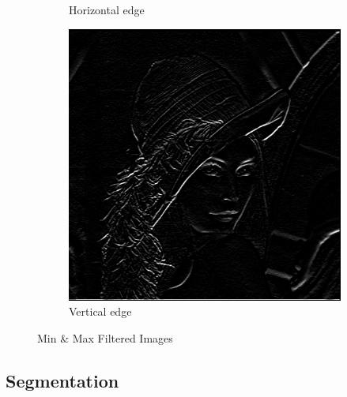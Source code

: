 \documentclass[a4paper,16pt]{article}
\begin{document}
\begin{figure}[h!]
\begin{subfigure}[h!]{0.45\linewidth}
			\caption{Horizontal edge}
		\end{subfigure}
		\hfill
		\begin{subfigure}[h!]{0.45\linewidth}
			\includegraphics[width=\linewidth]{vertical}
			\caption{Vertical edge}
		\end{subfigure}%
		\caption{Min \& Max Filtered Images}
	\end{figure}
	\newpage
	
	\subsection{Segmentation}
	
	\newpage
\end{document}
